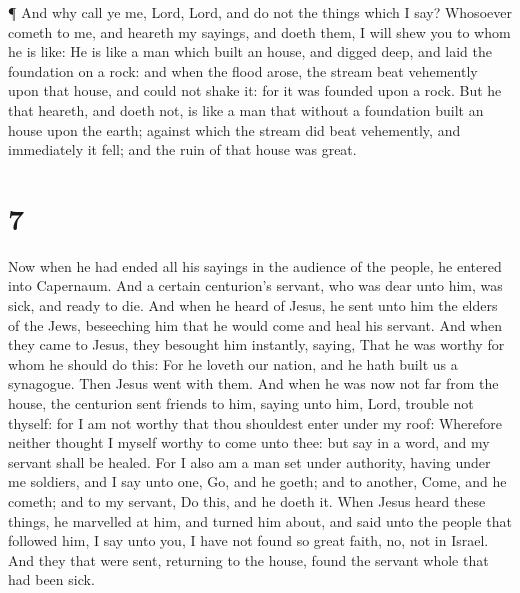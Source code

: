  ¶ And why call ye me, Lord, Lord, and do not the things
which I say?  Whosoever cometh to me, and heareth my
sayings, and doeth them, I will shew you to whom he is like:
 He is like a man which built an house, and digged deep,
and laid the foundation on a rock: and when the flood arose, the stream
beat vehemently upon that house, and could not shake it: for it was
founded upon a rock.  But he that heareth, and doeth not,
is like a man that without a foundation built an house upon the earth;
against which the stream did beat vehemently, and immediately it fell;
and the ruin of that house was great.

\hypertarget{section-6}{%
\section{7}\label{section-6}}

 Now when he had ended all his sayings in the audience of
the people, he entered into Capernaum.  And a certain
centurion's servant, who was dear unto him, was sick, and ready to die.
 And when he heard of Jesus, he sent unto him the elders of
the Jews, beseeching him that he would come and heal his servant.
 And when they came to Jesus, they besought him instantly,
saying, That he was worthy for whom he should do this:  For
he loveth our nation, and he hath built us a synagogue. 
Then Jesus went with them. And when he was now not far from the house,
the centurion sent friends to him, saying unto him, Lord, trouble not
thyself: for I am not worthy that thou shouldest enter under my roof:
 Wherefore neither thought I myself worthy to come unto
thee: but say in a word, and my servant shall be healed. 
For I also am a man set under authority, having under me soldiers, and I
say unto one, Go, and he goeth; and to another, Come, and he cometh; and
to my servant, Do this, and he doeth it.  When Jesus heard
these things, he marvelled at him, and turned him about, and said unto
the people that followed him, I say unto you, I have not found so great
faith, no, not in Israel.  And they that were sent,
returning to the house, found the servant whole that had been sick.

